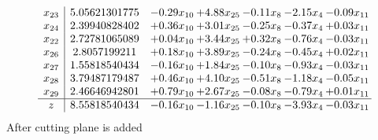 \documentclass[8pt]{article}
\begin{document}
\[\begin{array}{c| c c@{\hskip 2pt} c@{\hskip 2pt} c@{\hskip 2pt} c@{\hskip 2pt} c@{\hskip 2pt} }
 x_{23}   &  5.05621301775 & -0.29 x_{10} & +  4.88 x_{25} & -0.11 x_{8} & -2.15 x_{4} & -0.09 x_{11}\\
 x_{24}   &  2.39940828402 & +  0.36 x_{10} & +  3.01 x_{25} & -0.25 x_{8} & -0.37 x_{4} & +  0.03 x_{11}\\
 x_{22}   &  2.72781065089 & +  0.04 x_{10} & +  3.44 x_{25} & +  0.32 x_{8} & -0.76 x_{4} & -0.03 x_{11}\\
 x_{26}   &  2.8057199211 & +  0.18 x_{10} & +  3.89 x_{25} & -0.24 x_{8} & -0.45 x_{4} & +  0.02 x_{11}\\
 x_{27}   &  1.55818540434 & -0.16 x_{10} & +  1.84 x_{25} & -0.10 x_{8} & -0.93 x_{4} & -0.03 x_{11}\\
 x_{28}   &  3.79487179487 & +  0.46 x_{10} & +  4.10 x_{25} & -0.51 x_{8} & -1.18 x_{4} & -0.05 x_{11}\\
 x_{29}   &  2.46646942801 & +  0.79 x_{10} & +  2.67 x_{25} & -0.08 x_{8} & -0.79 x_{4} & +  0.01 x_{11}\\
\hline
z    &  8.55818540434 & -0.16 x_{10} & -1.16 x_{25} & -0.10 x_{8} & -3.93 x_{4} & -0.03 x_{11}\\
\end{array}\]
 After cutting plane is added 
\end{document}
